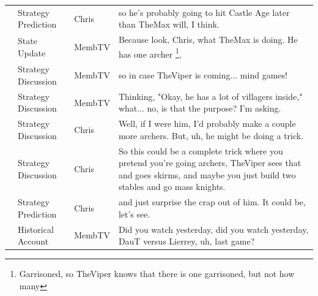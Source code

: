 {\begin{longtable}{@{}>{\theAppRow}r|L{2.3cm}L{1.0cm}U{11.55cm}@{}}
    & Strategy Prediction   & Chris        & so he's probably going to hit Castle Age later than TheMax will, I think.                                                                                                                                                                                        \\
    & State Update          & MembTV       & Because look, Chris, what TheMax is doing. He has one archer \footnote{Garrisoned, so TheViper knows that there is one garrisoned, but not how many},                                                                                                                                                                                                    \\
    & Strategy Discussion   & MembTV       & so in case TheViper is coming... mind games!                                                                                                                                                                                                                     \\
    & Strategy Discussion   & MembTV       & Thinking, "Okay, he has a lot of villagers inside," what... no, is that the purpose? I'm asking.                                                                                                                                                                 \\
    & Strategy Discussion   & Chris        & Well, if I were him, I'd probably make a couple more archers. But, uh, he might be doing a trick.                                                                                                                                                                \\
    & Strategy Discussion   & Chris        & So this could be a complete trick where you pretend you're going archers, TheViper sees that and goes skirms, and maybe you just build two stables and go mass knights.                                                                                          \\
    & Strategy Prediction   & Chris        & and just surprise the crap out of him. It could be, let's see.                                                                                                                                                                                                   \\
    & Historical Account    & MembTV       & Did you watch yesterday, did you watch yesterday, DauT versus Lierrey, uh, last game?                                                                                                                                                                            \\

\end{longtable}}
